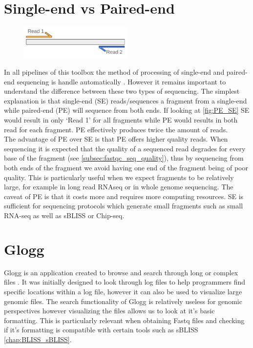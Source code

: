 \label{chap:misc}
\section{Single-end vs Paired-end \label{sec:SE_vs_PE}}
\begin{figure}
  \begin{center}
    \includegraphics[width=0.5\textwidth]{figures/PE_SE.png}
  \end{center}
  \label{fig:PE_SE}
\end{figure}
In all pipelines of this toolbox the method of processing of single-end and paired-end sequencing is handle automatically . However it remains important to understand the difference between these two types of sequencing. The simplest explanation is that single-end (SE) reads/sequences a fragment from a single-end while paired-end (PE) will sequence from both ends. If looking at \autoref{fig:PE_SE} SE would result in only `Read 1' for all fragments while PE would results in both read for each fragment. PE effectively produces twice the amount of reads.\\
The advantage of PE over SE is that PE offers higher quality reads. When sequencing it is expected that the quality of a sequenced read degrades for every base of the fragment (see \autoref{subsec:fastqc_seq_quality}), thus by sequencing from both ends of the fragment we avoid having one end of the fragment being of poor quality. This is particularly useful when we expect fragments to be relatively large, for example in long read RNAseq or in whole genome sequencing. The caveat of PE is that it costs more and requires more computing resources. SE is sufficient for sequencing protocols which generate small fragments such as small RNA-seq as well as sBLISS or Chip-seq.

\section{Glogg \label{sec:glogg}}
Glogg is an application created to browse and search through long or complex files \cite{Glogg}. It was initially designed to look through log files to help programmers find specific locations within a log file, however it can also be used to visualize large genomic files. The search functionality of Glogg is relatively useless for genomic perspectives however visualizing the files allows us to look at it's basic formatting. This is particularly relevant when obtaining Fastq files and checking if it's formatting is compatible with certain tools such as sBLISS \autoref{chap:BLISS_sBLISS}.

